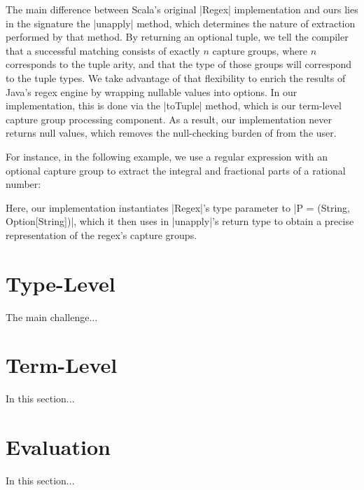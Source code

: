 The main difference between Scala's original |Regex| implementation and ours lies in the signature the |unapply| method, which determines the nature of extraction performed by that method.
By returning an optional tuple, we tell the compiler that a successful matching consists of exactly $n$ capture groups, where $n$ corresponds to the tuple arity, and that the type of those groups will correspond to the tuple types.
We take advantage of that flexibility to enrich the results of Java's regex engine by wrapping nullable values into options.
In our implementation, this is done via the |toTuple| method, which is our
term-level capture group processing component.
As a result, our implementation never returns null values, which removes the null-checking burden of from the user.

For instance, in the following example, we use a regular expression with an optional capture group to extract the integral and fractional parts of a rational number:

\regexRational

\noindent
Here, our implementation instantiates |Regex|'s type parameter to |P = (String, Option[String])|, which it then uses in |unapply|'s return type to obtain a precise representation of the regex's capture groups.

\section{Type-Level}
\label{sec:type-level}

The main challenge...

\section{Term-Level}
\label{sec:term-level}

In this section...

\section{Evaluation}

In this section...
